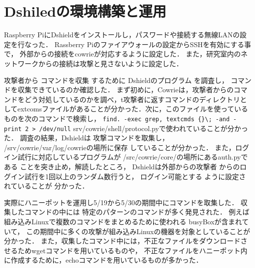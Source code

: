 \documentclass[dvipdfmx]{bta}
\begin{document}
\chapter{Dshiledの環境構築と運用}

Raspberry PiにDshieldをインストールし，パスワードや接続する無線LANの設定を行なった．
Rassberry Piのファイアウォールの設定からSSHを有効にする事で，
外部からの接続をcowrieが対応するように設定した．
また，研究室内のネットワークからの接続は攻撃と見さないように設定した．


攻撃者から
コマンドを収集
するために
Dshieldのプログラム
を調査し，
コマンドを収集できているのか確認した．
まず初めに，Cowrieは，攻撃者からのコマンドをどう対処しているのかを調べ，t攻撃者に返すコマンドのディレクトリとしてextcomsファイルがあることが分かった．次に，このファイルを使っているものを次のコマンドで検索し，
\verb!find. -exec grep, textcmds {}\; -and -print 2 > /dev/null!
srv/cowrie/shell/protocol.pyで使われていることが分かった．
調査の結果，Dshieldは
攻撃コマンドを取集し，
/srv/cowrie/var/log/cowrieの場所に保存
していることが分かった．
また，ログイン試行に対応しているプログラムが
/src/cowrie/core/の場所にあるauth.pyである
ことを突き止め，解読したところ，
Dshieldは外部からの攻撃者
からのログイン試行を1回以上のランダム数行うと，
ログイン可能とする
ように設定されていることが
分かった．


実際にハニーポットを運用し5/19から5/30の期間中にコマンドを取集した．
収集したコマンドの中には
特定のパターンのコマンドが多く発見された．
例えば組み込みLinuxで複数のコマンドをまとめるために使われる
busyBoxが含まれていて，
この期間中に多くの攻撃が組み込みLinuxの機器を対象としていることが分かった．
また，収集したコマンド中には，不正なファイルをダウンロードさせるためwgetコマンドを用いているものや，
不正なファイルをハニーポット内に作成するために，echoコマンドを用いているものが多かった．
\end{document}
